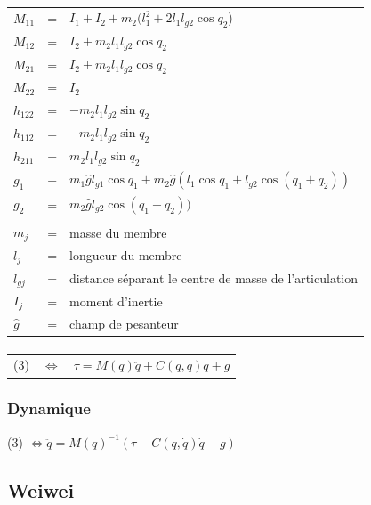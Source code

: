 \documentclass[pdftex,a4paper,11pt]{article}
\begin{document}
\paragraph{}
\begin{tabular}{lcl}
    $M_{11}$ & = & $I_1 + I_2 + m_2(l_1^2 + 2 l_1 l_{g2}\cos q_2$) \\
    $M_{12}$ & = & $I_2 + m_2l_1l_{g2}\cos q_2$ \\
    $M_{21}$ & = & $I_2 + m_2l_1l_{g2}\cos q_2$ \\
    $M_{22}$ & = & $I_2$ \\
    $h_{122}$ & = & $-m_2 l_1 l_{g2} \sin q_2$ \\
    $h_{112}$ & = & $-m_2 l_1 l_{g2} \sin q_2$ \\
    $h_{211}$ & = & $m_2 l_1 l_{g2} \sin q_2$ \\
    $g_1$ & = & $m_1 \hat{g} l_{g1} \cos q_1 + m_2 \hat{g} (l_1 \cos q_1 + l_{g2} \cos(q_1 + q_2))$ \\
    $g_2$ & = & $m_2 \hat{g} l_{g2} \cos(q_1 + q_2))$ \\
    \\
    $m_j$ & = & masse du membre \\
    $l_j$ & = & longueur du membre \\
    $l_{gj}$ & = & distance séparant le centre de masse de l'articulation \\
    $I_{j}$ & = & moment d'inertie \\
    $\hat{g}$ & = & champ de pesanteur \\
\end{tabular}

\paragraph{}
\begin{tabular}{lcl}
    (3) & $\Leftrightarrow$ & $\tau = M(q)\ddot{q} + C(q, \dot{q}) \dot{q} + g$ \\
\end{tabular}

\subsubsection{Dynamique}
(3) $\Leftrightarrow \ddot{q} = M(q)^{-1} (\tau - C(q, \dot{q}) \dot{q} - g) $


\subsection{Weiwei}
\end{document}
